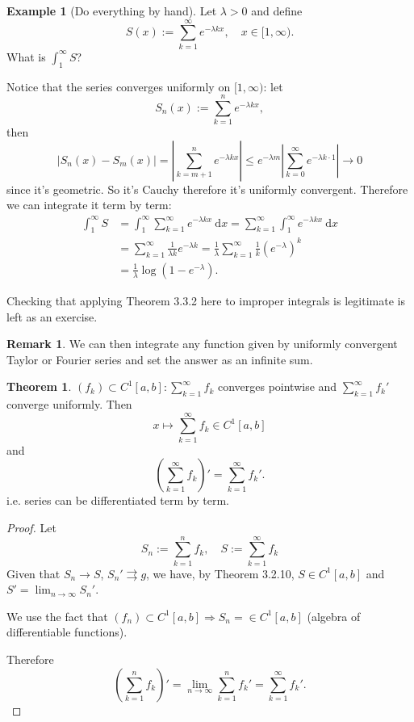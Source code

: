 \documentclass[a4paper]{article}
\theoremstyle{definition}
\newtheorem{thm}[defn]{Theorem}
\newtheorem{example}[defn]{Example}
\newtheorem*{remark}{Remark}
\begin{document}
\begin{example}[Do everything by hand]
Let $\lambda >0$ and define
\[
S(x):=\sum_{k=1}^\infty e^{-\lambda kx},\quad x\in [1,\infty) .
\]
What is $\int_1^\infty S$?

Notice that the series converges uniformly on $[1,\infty)$: let
\[
S_n(x):=\sum_{k=1}^n e^{-\lambda k x},
\]
then
\[
|S_n(x)-S_m(x)|=\left|\sum_{k=m+1}^n e^{-\lambda k x}\right| \leq e^{-\lambda m} \left|\sum_{k=0}^\infty e^{-\lambda k \cdot 1} \right| \rightarrow 0
\]
since it's geometric. So it's Cauchy therefore it's uniformly convergent. Therefore we can integrate it term by term:
\[
\begin{aligned}
\int_1^\infty S &= \int_1^\infty \sum_{k=1}^\infty e^{-\lambda k x} \ \mathrm d x = \sum_{k=1}^\infty \int_1^\infty e^{-\lambda k x} \ \mathrm d x \\&= \sum_{k=1}^\infty \frac{1}{\lambda k} e^{-\lambda k} = \frac{1}{\lambda} \sum_{k=1}^\infty \frac{1}{k}\left(e^{-\lambda}\right)^k \\&= \frac{1}{\lambda} \log \left(1-e^{-\lambda} \right).
\end{aligned}
\]
\end{example}
Checking that applying Theorem 3.3.2 here to improper integrals is legitimate is left as an exercise.

\begin{remark}
We can then integrate any function given by uniformly convergent Taylor or Fourier series and set the answer as an infinite sum.
\end{remark}

\begin{thm}
$\displaystyle (f_k) \subset C^1 [a,b] : \sum_{k=1}^\infty f_k$ converges pointwise and $\displaystyle \sum_{k=1}^\infty f_k'$ converge uniformly. Then
\[
x\mapsto \sum_{k=1}^\infty f_k \in C^1[a,b]
\]
and
\[
\left(\sum_{k=1}^\infty f_k\right)' = \sum_{k=1}^\infty f_k' .
\]
i.e. series can be differentiated term by term.
\end{thm}
\begin{proof}
Let
\[
S_n := \sum_{k=1}^n f_k ,\quad S := \sum_{k=1}^\infty f_k
\]
Given that $S_n \rightarrow S$, $S_n' \rightrightarrows g$, we have, by Theorem 3.2.10, $S\in C^1[a,b]$ and $\displaystyle S'=\lim_{n\rightarrow \infty} S_n'$.

We use the fact that $(f_n) \subset C^1[a,b] \Rightarrow S_n= \in C^1[a,b]$ (algebra of differentiable functions).

Therefore
\[
\left(\sum_{k=1}^n f_k \right)' = \lim_{n\rightarrow \infty} \sum_{k=1}^n f_k' = \sum_{k=1}^\infty f_k' .
\]
\end{proof}
\end{document}
